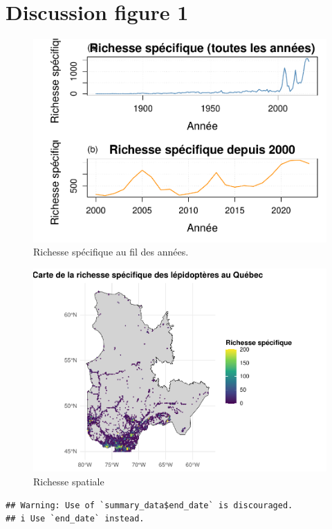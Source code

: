 \documentclass[9pt,twocolumn,twoside,]{pnas-new}
\begin{document}
\section*{Discussion figure 1}\label{discussion-figure-1}

\begin{figure}

{\centering \includegraphics[width=0.7\linewidth]{rapport_final_BIO500_files/figure-latex/fig:fig_richesse_temporelle-1} 

}

\caption{\label{fig:fig_richesse_temporelle}Richesse spécifique au fil des années.}\label{fig:fig:fig_richesse_temporelle}
\end{figure}

\begin{figure}

{\centering \includegraphics[width=0.7\linewidth]{rapport_final_BIO500_files/figure-latex/fig:fig_richesse_spatiale-1} 

}

\caption{\label{fig:fig_richesse_spatiale}Richesse spatiale }\label{fig:fig:fig_richesse_spatiale}
\end{figure}

\begin{verbatim}
## Warning: Use of `summary_data$end_date` is discouraged.
## i Use `end_date` instead.
\end{verbatim}
\end{document}
